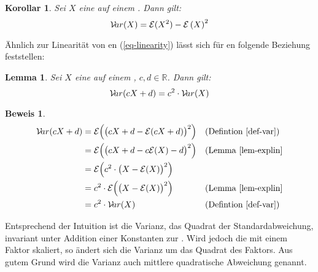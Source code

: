 \documentclass[a4paper]{article}
\newtheorem{korollar}[satz]{Korollar}
\newtheorem{lemma}[satz]{Lemma}
\theoremstyle{nonumberplain}
\newtheorem{beweis}{Beweis}
\begin{document}
	\begin{korollar}\label{kor-var-exp}
		Sei $X$ eine \rvar{} auf einem \probspace{}. Dann gilt:
		\begin{equation}
		\mathcal{V}\!ar(X) = \mathcal{E}(X^{2}) - \mathcal{E}\left(X\right)^{2}
		\end{equation}
	\end{korollar}
	Ähnlich zur Linearität von \expect{}en (\ref{eq-linearity}) lässt sich für \var{}en folgende Beziehung feststellen:
	\begin{lemma}\label{lemma-var-qlinear}
		Sei $X$ eine \rvar{} auf einem \probspace{}, $c,d \in \mathbb{R}$. Dann gilt:
		\begin{equation}
		\mathcal{V}\!ar(cX + d) = c^2\cdot\mathcal{V}\!ar(X)
		\end{equation}
	\end{lemma}
	\begin{beweis}
		\begin{align*}
		\mathcal{V}\!ar(cX + d) & = \mathcal{E}\Big(\big(cX + d - \mathcal{E}(cX + d)\big)^2\Big) && \text{(Defintion \ref{def-var})} \\
		& = \mathcal{E}\Big(\big(cX + d - c\mathcal{E}(X) - d\big)^2\Big) && \text{(Lemma \ref{lem-explin}}\\
		& = \mathcal{E}\Big(c^2 \cdot \big(X - \mathcal{E}(X) \big)^2\Big)\\
		& = c^2 \cdot \mathcal{E}\Big( \big(X - \mathcal{E}(X) \big)^2\Big) && \text{(Lemma \ref{lem-explin}}\\
		& = c^2 \cdot \mathcal{V}\!ar(X) && \text{(Defintion \ref{def-var})}
		\end{align*}
	\end{beweis}
	Entsprechend der Intuition ist die Varianz, das Quadrat der Standardabweichung, invariant unter Addition einer Konstanten zur \rvar{}. Wird jedoch die \rvar{} mit einem Faktor skaliert, so ändert sich die Varianz um das Quadrat des Faktors. Aus gutem Grund wird die Varianz auch mittlere quadratische Abweichung genannt.
	
\end{document}
